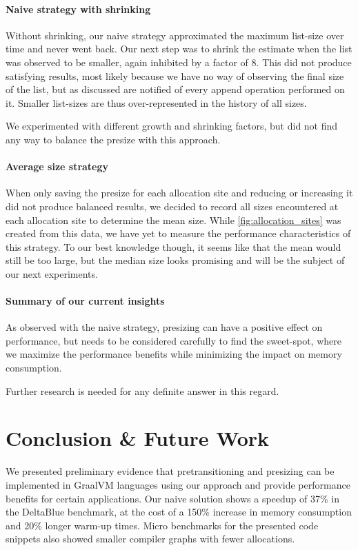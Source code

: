 \documentclass[sigconf, review, balance=false]{acmart}
\begin{document}
\paragraph{Naive strategy with shrinking}
Without shrinking, our naive strategy approximated the maximum
list-size over time and never went back. Our next step was to shrink
the estimate when the list was observed to be smaller, again inhibited
by a factor of $8$. This did not produce satisfying results, most
likely because we have no way of observing the final size of the list,
but as discussed are notified of every append operation performed on
it. Smaller list-sizes are thus over-represented in the history of all
sizes.

We experimented with different growth and shrinking factors, but did
not find any way to balance the presize with this approach.

\paragraph{Average size strategy}
When only saving the presize for each allocation site and reducing or
increasing it did not produce balanced results, we decided to record
all sizes encountered at each allocation site to determine the mean
size. While \autoref{fig:allocation_sites} was created from this data,
we have yet to measure the performance characteristics of this
strategy. To our best knowledge though, it seems like that the mean
would still be too large, but the median size looks promising and will
be the subject of our next experiments.


\paragraph{Summary of our current insights}
As observed with the naive strategy, presizing can have a positive
effect on performance, but needs to be considered carefully to find
the sweet-spot, where we maximize the performance benefits while
minimizing the impact on memory consumption.

Further research is needed for any definite answer in this regard.

\section{Conclusion \& Future Work}
\label{sec:conclusion}
We presented preliminary evidence that pretransitioning and presizing
can be implemented in GraalVM languages using our approach and provide
performance benefits for certain applications. Our naive solution
shows a speedup of 37\% in the DeltaBlue benchmark, at the cost of a
150\% increase in memory consumption and 20\% longer warm-up
times. Micro benchmarks for the presented code snippets also showed
smaller compiler graphs with fewer allocations.
\end{document}
